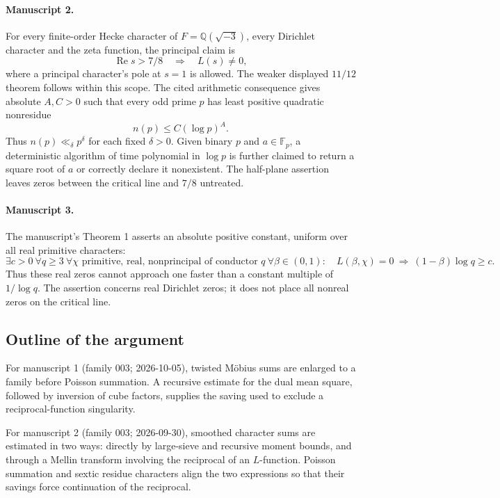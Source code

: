 \documentclass[11pt]{article}
\begin{document}
\paragraph{Manuscript 2.}
For every finite-order Hecke character of $F=\mathbb Q(\sqrt{-3})$, every Dirichlet character and the zeta function, the principal claim is
\[
 \operatorname{Re}s>7/8\quad\Longrightarrow\quad L(s)\ne0,
\]
where a principal character's pole at $s=1$ is allowed. The weaker displayed $11/12$ theorem follows within this scope. The cited arithmetic consequence gives absolute $A,C>0$ such that every odd prime $p$ has least positive quadratic nonresidue
\[
 n(p)\le C(\log p)^A.
\]
Thus $n(p)\ll_{\delta} p^{\delta}$ for each fixed $\delta>0$. Given binary $p$ and $a\in\mathbb F_p$, a deterministic algorithm of time polynomial in $\log p$ is further claimed to return a square root of $a$ or correctly declare it nonexistent. The half-plane assertion leaves zeros between the critical line and $7/8$ untreated.

\paragraph{Manuscript 3.}
The manuscript's Theorem 1 asserts an absolute positive constant, uniform over all real primitive characters:
\[
 \exists c>0\ \forall q\ge3\ \forall\chi\text{ primitive, real, nonprincipal of conductor }q
 \ \forall\beta\in(0,1):\quad L(\beta,\chi)=0
 \ \Longrightarrow\ (1-\beta)\log q\ge c.
\]
Thus these real zeros cannot approach one faster than a constant multiple of $1/\log q$. The assertion concerns real Dirichlet zeros; it does not place all nonreal zeros on the critical line.

\subsection{Outline of the argument}
For manuscript 1 (family 003; 2026-10-05), twisted M\"obius sums are enlarged to a family before Poisson summation. A recursive estimate for the dual mean square, followed by inversion of cube factors, supplies the saving used to exclude a reciprocal-function singularity.

For manuscript 2 (family 003; 2026-09-30), smoothed character sums are estimated in two ways: directly by large-sieve and recursive moment bounds, and through a Mellin transform involving the reciprocal of an $L$-function. Poisson summation and sextic residue characters align the two expressions so that their savings force continuation of the reciprocal.
\end{document}
